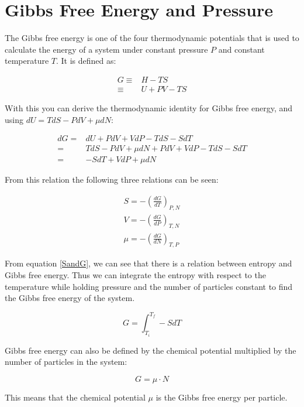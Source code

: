 \documentclass[../hand-in3.tex]{subfiles}
\begin{document}
\section{Gibbs Free Energy and Pressure}

The Gibbs free energy is one of the four thermodynamic potentials that is used to calculate the energy of a system under constant pressure $P$ and constant temperature $T$. It is defined as:

\begin{align} 
G \equiv& H - TS \nonumber \\
  \equiv& U +PV -TS \label{Gibbs}	
\end{align}

With this you can derive the thermodynamic identity for Gibbs free energy, and using $dU = TdS - PdV + \mu dN$:

\begin{align}
dG =& dU + PdV + VdP -TdS -SdT \nonumber \\
   =& TdS - PdV + \mu dN + PdV + VdP -TdS -SdT \nonumber \\ 
   =& -SdT + VdP + \mu dN
\end{align}

From this relation the following three relations can be seen:

\begin{align}
S = - \left( \frac{dG}{dT} \right)_{P,N} \label{SandG} \\
V = - \left( \frac{dG}{dP} \right)_{T,N} \nonumber \\
\mu = - \left( \frac{dG}{dN} \right)_{T,P} \nonumber 
\end{align}

From equation \ref{SandG}, we can see that there is a relation between entropy and Gibbs free energy. Thus we can integrate the entropy with respect to the temperature while holding pressure and the number of particles constant to find the Gibbs free energy of the system.

\begin{equation}
G = \int_{T_i}^{T_f} -SdT
\end{equation}

Gibbs free energy can also be defined by the chemical potential multiplied by the number of particles in the system:

\begin{equation}
G = \mu \cdot N
\end{equation} 

This means that the chemical potential $\mu$ is the Gibbs free energy per particle.
\end{document}
